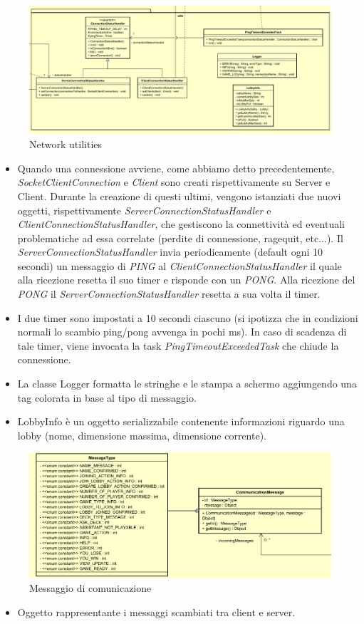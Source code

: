 \documentclass[a4paper, 12pt]{article}
\begin{document}
	\begin{figure}[h!]
		\centering
		\includegraphics[scale=0.7]{networkUtils.png}
		\caption{Network utilities}
	\end{figure}
	\begin{itemize}
		\item Quando una connessione avviene, come abbiamo detto precedentemente, \textit{SocketClientConnection} e \textit{Client} sono creati rispettivamente su Server e Client. Durante la creazione di questi ultimi, vengono istanziati due nuovi oggetti, rispettivamente \textit{ServerConnectionStatusHandler} e \textit{ClientConnectionStatusHandler}, che gestiscono la connettività ed eventuali problematiche ad essa correlate (perdite di connessione, ragequit, etc...). Il \textit{ServerConnectionStatusHandler} invia periodicamente (default ogni 10 secondi) un messaggio di \textit{PING} al \textit{ClientConnectionStatusHandler} il quale alla ricezione resetta il suo timer e risponde con un \textit{PONG}. Alla ricezione del \textit{PONG} il \textit{ServerConnectionStatusHandler} resetta a sua volta il timer. \cite{javaUtilTimer}
		\item I due timer sono impostati a 10 secondi ciascuno (si ipotizza che in condizioni normali lo scambio ping/pong avvenga in pochi ms). In caso di scadenza di tale timer, viene invocata la task \textit{PingTimeoutExceededTask} che chiude la connessione.
		\item La classe Logger formatta le stringhe e le stampa a schermo aggiungendo una tag colorata in base al tipo di messaggio.
		\item LobbyInfo è un oggetto serializzabile contenente informazioni riguardo una lobby (nome, dimensione massima, dimensione corrente).
	\end{itemize}
	\begin{figure}[h!]
		\centering
		\includegraphics[scale=0.7]{communicationMessage.png}
		\caption{Messaggio di comunicazione}
	\end{figure}
	\begin{itemize}
		\item Oggetto rappresentante i messaggi scambiati tra client e server.
	\end{itemize}
\end{document}
